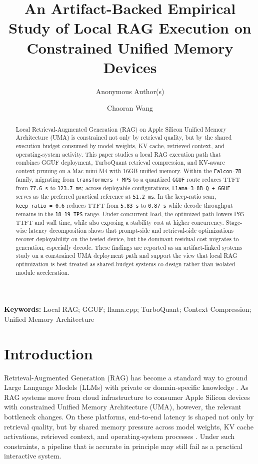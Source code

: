 \documentclass[10pt,twocolumn]{article}
\title{An Artifact-Backed Empirical Study of Local RAG Execution on Constrained Unified Memory Devices}
\author[1]{Anonymous Author(s)}
\affil[1]{Anonymous Institution}
\author[1]{Chaoran Wang}
\affil[1]{College of Science and Information, Qingdao Agricultural University, Qingdao, China\\
Email: \texttt{chaoranw47@gmail.com}}
\date{}
\begin{document}
\maketitle

\begin{abstract}
Local Retrieval-Augmented Generation (RAG) on Apple Silicon Unified Memory Architecture (UMA) is constrained not only by retrieval quality, but by the shared execution budget consumed by model weights, KV cache, retrieved context, and operating-system activity. This paper studies a local RAG execution path that combines GGUF deployment, TurboQuant retrieval compression, and KV-aware context pruning on a Mac mini M4 with 16GB unified memory. Within the \texttt{Falcon-7B} family, migrating from \texttt{transformers + MPS} to a quantized \texttt{GGUF} route reduces TTFT from \texttt{77.6 s} to \texttt{123.7 ms}; across deployable configurations, \texttt{Llama-3-8B-Q + GGUF} serves as the preferred practical reference at \texttt{51.2 ms}. In the keep-ratio scan, \texttt{keep\_ratio = 0.6} reduces TTFT from \texttt{5.83 s} to \texttt{0.87 s} while decode throughput remains in the \texttt{18--19 TPS} range. Under concurrent load, the optimized path lowers P95 TTFT and wall time, while also exposing a stability cost at higher concurrency. Stage-wise latency decomposition shows that prompt-side and retrieval-side optimizations recover deployability on the tested device, but the dominant residual cost migrates to generation, especially decode. These findings are reported as an artifact-linked systems study on a constrained UMA deployment path and support the view that local RAG optimization is best treated as shared-budget systems co-design rather than isolated module acceleration.
\end{abstract}

\textbf{Keywords:} Local RAG; GGUF; llama.cpp; TurboQuant; Context Compression; Unified Memory Architecture

\section{Introduction}

Retrieval-Augmented Generation (RAG) has become a standard way to ground Large Language Models (LLMs) with private or domain-specific knowledge \cite{gao2023rag}. As RAG systems move from cloud infrastructure to consumer Apple Silicon devices with constrained Unified Memory Architecture (UMA), however, the relevant bottleneck changes. On these platforms, end-to-end latency is shaped not only by retrieval quality, but by shared memory pressure across model weights, KV cache activations, retrieved context, and operating-system processes \cite{hannun2023mlx}. Under such constraints, a pipeline that is accurate in principle may still fail as a practical interactive system.
\end{document}
